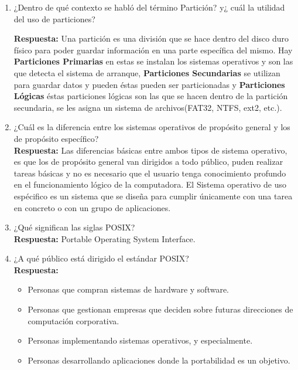 \documentclass[a4paper, 11pt, oneside]{article}
\begin{document}
\begin{enumerate}
    \item ¿Dentro de qué contexto se habló del término Partición? y¿ cuál la utilidad del uso
    de particiones?

    \textbf{Respuesta:} Una partición es una división que se hace dentro del disco duro físico para poder guardar información en una parte específica del mismo. Hay \textbf{Particiones Primarias} en estas se instalan los sistemas operativos y son las que detecta el sistema de arranque, \textbf{Particiones Secundarias} se utilizan para guardar datos y pueden éstas pueden ser particionadas  y \textbf{Particiones Lógicas} éstas particiones lógicas son las que se hacen dentro de la partición secundaria, se les asigna un sistema de archivos(FAT32, NTFS, ext2, etc.).

    \item ¿Cuál es la diferencia entre los sistemas operativos de propósito general y los de
    propósito específico?\\
    \textbf{Respuesta:} Las diferencias básicas entre ambos tipos de sistema operativo, es que los de propósito general van dirigidos a todo público, puden realizar tareas básicas y no es necesario que el usuario tenga conocimiento profundo en el funcionamiento lógico de la computadora. El Sistema operativo de uso espécifico es un sistema que se diseña para cumplir únicamente con una tarea en concreto o con un grupo de aplicaciones. 

    \item ¿Qué significan las siglas POSIX?\\
    \textbf{Respuesta:} Portable Operating System Interface.
    
    \item ¿A qué público está dirigido el estándar POSIX?\\
    \textbf{Respuesta:}
    \begin{itemize}
        \item Personas que compran sistemas de hardware y software.
        \item Personas que gestionan empresas que deciden sobre futuras direcciones de computación corporativa.
        \item Personas implementando sistemas operativos, y especialmente.
        \item Personas desarrollando aplicaciones donde la portabilidad es un objetivo.
    \end{itemize}
    

\end{enumerate}
\end{document}
